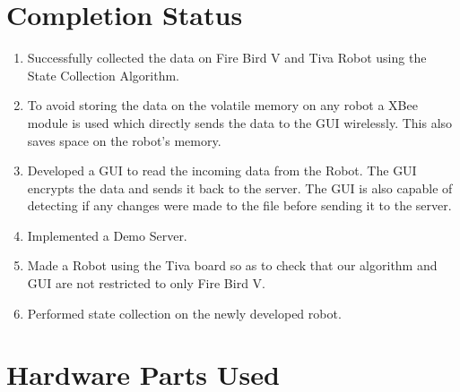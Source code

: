 \documentclass[a4paper,12pt,oneside]{book}
\begin{document}
\section{Completion Status}

\begin{enumerate}

    \item Successfully collected the data on Fire Bird V and Tiva Robot using the State Collection Algorithm.
    \item To avoid storing the data on the volatile memory on any robot a XBee module is used which directly sends the data to the GUI wirelessly. This also saves space on the robot's memory.
    \item Developed a GUI to read the incoming data from the Robot. The GUI encrypts the data and sends it back to the server. The GUI is also capable of detecting if any changes were made to the file before sending it to the server.
    \item Implemented a Demo Server.
    \item Made a Robot using the Tiva board so as to check that our algorithm and GUI are not restricted to only Fire Bird V.
    \item Performed state collection on the newly developed robot.
\newpage

\end{enumerate}

\section{Hardware Parts Used}
\end{document}
